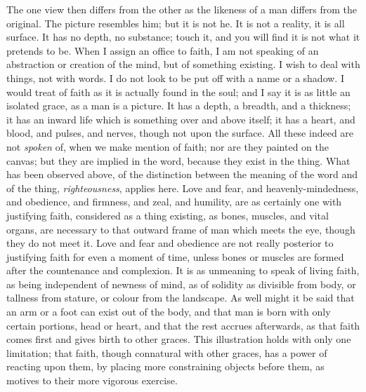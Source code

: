 The one view then differs from the other as the likeness of a man
differs from the original. The picture resembles him; but it is
not he. It is not a reality, it is all surface. It has no depth, no
substance; touch it, and you will find it is not what it pretends to
be. When I assign an office to faith, I am not speaking of an
abstraction or creation of the mind, but of something existing. I wish
to deal with things, not with words. I do not look to be put off with
a name or a shadow. I would treat of faith as it is actually found in
the soul; and I say it is as little an isolated grace, as a man is a
picture. It has a depth, a breadth, and a thickness; it has an inward
life which is something over and above itself; it has a heart, and
blood, and pulses, and nerves, though not upon the surface. All these
indeed are not \emph{spoken} of, when we make mention of faith; nor are they
painted on the canvas; but they are implied in the word, because they
exist in the thing. What has been observed above, of the distinction
between the meaning of the word and of the thing, \emph{righteousness},
applies here. Love and fear, and heavenly-mindedness, and obedience,
and firmness, and zeal, and humility, are as certainly one with
justifying faith, considered as a thing existing, as bones, muscles,
and vital organs, are necessary to that outward frame of man which
meets the eye, though they do not meet it. Love and fear and obedience
are not really posterior to justifying faith for even a moment of
time, unless bones or muscles are formed after the countenance and
complexion. It is as unmeaning to speak of living faith, as being
independent of newness of mind, as of solidity as divisible from body,
or tallness from stature, or colour from the landscape. As well might
it be said that an arm or a foot can exist out of the body, and
that man is born with only certain portions, head or heart, and that
the rest accrues afterwards, as that faith comes first and gives birth
to other graces. This illustration holds with only one limitation;
that faith, though connatural with other graces, has a power of
reacting upon them, by placing more constraining objects before them,
as motives to their more vigorous exercise.

